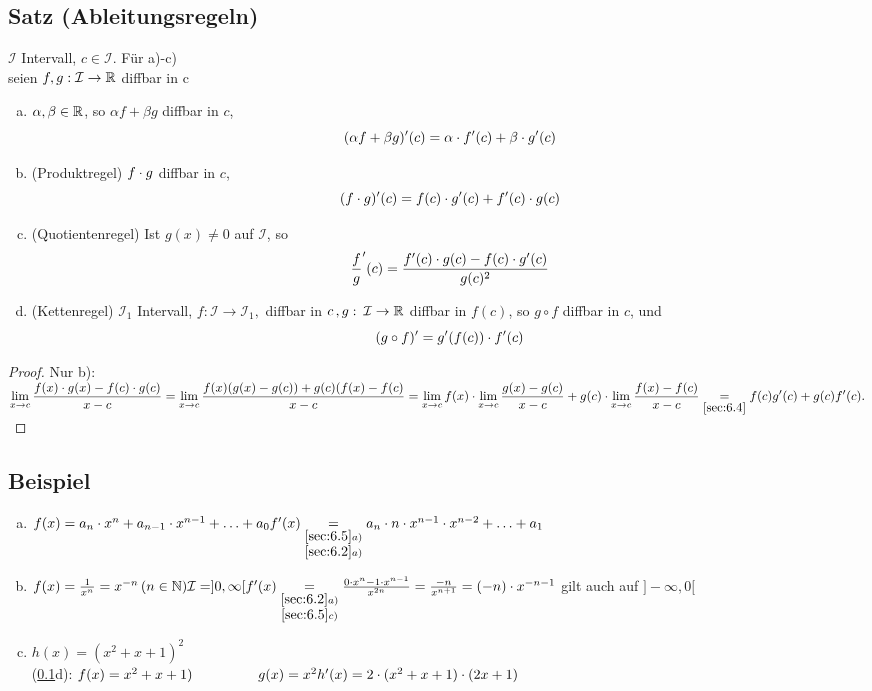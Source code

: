\subsection{Satz (Ableitungsregeln)}\label{sec:6.5}
$\mathcal{I}$ Intervall, $c \in \mathcal{I}$. Für a)-c)\\
seien $f,g : \mathcal{I} \to \mathbb{R} $ diffbar in c\\
\begin{enumerate}[a)]
\item $\alpha, \beta \in \mathbb{R}$, so $\alpha f + \beta g $ diffbar in $c$,
$$(\alpha f + \beta g)'(c) = \alpha \cdot f'(c) + \beta \cdot g'(c)$$
\item (Produktregel) $f \cdot g$ diffbar in $c$,\\
$$(f \cdot g)'(c) = f(c) \cdot g'(c) + f'(c) \cdot g(c)$$
\item (Quotientenregel) Ist $g (x) \neq 0$ auf $\mathcal{I}$, so $$\frac{f}{g}'(c) = \frac{f'(c) \cdot g(c) - f(c) \cdot g'(c)}{g(c)^2}$$
\item (Kettenregel)
$\mathcal{I}_1$ Intervall, $f: \mathcal{I} \to \mathcal{I}_1,$ diffbar in $c\, ,g:\: \mathcal{I} \to \mathbb{R}$ diffbar in $f(c)$, so $g \circ f$ diffbar in $c$, und \\
\[(g \circ f)' = g'(f(c)) \cdot f'(c) \]
\end{enumerate}
\begin{proof}
Nur b):\\
$\displaystyle \lim_{x \to c} \frac{f(x) \cdot g(x) - f(c) \cdot g(c)}{x-c} = \displaystyle \lim_{x \to c} \frac{f(x)(g(x) -g(c)) + g(c)(f(x) -f(c)}{x-c} = \displaystyle \lim_{x \to c}f(x) \cdot \displaystyle \lim_{x \to c} \frac{g(x) -g(c)}{x-c} + g(c) \cdot \displaystyle \lim_{x \to c} \frac{f(x) -f(c)}{x-c} \underset{\ref{sec:6.4}}{=}f(c) g'(c) + g(c) f'(c).$\\
\end{proof}
\subsection{Beispiel}
\begin{enumerate}[a)]
\item $f(x) = a_n \cdot x^n + a_{n-1} \cdot x^{n-1} + \ldots + a_0\\
f'(x) \underset{\substack{\ref{sec:6.5}a)\\
\ref{sec:6.2}a)}}{=} a_n \cdot n \cdot x^{n-1} \cdot x^{n-2} + \ldots + a_1$
\item $f(x) = \frac{1}{x^n} = x^{-n} \, (n \in \mathbb{N})\\
\mathcal{I} = ]0,\infty[\\
f'(x) \underset{\substack{\ref{sec:6.2}a)\\
\ref{sec:6.5}c)}}{=} \frac{0 \cdot x^n - 1 \cdot x^{n-1}}{x^{2n}} = \frac{-n}{x^{n+1}} = (-n) \cdot x^{-n-1}$ gilt auch auf $]-\infty,0[$
\item $h(x) = (x^2 + x + 1)^2$\\
(\ref{sec:6.5}d): $f(x) = x^2 + x + 1)\\
\phantom{(\ref{sec:6.5}d)}g(x)= x^2\\
h'(x) = 2 \cd (x^2 + x + 1) \cd (2x + 1)$
\end{enumerate}
